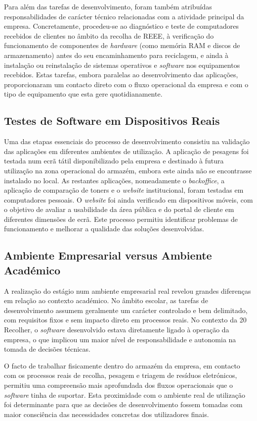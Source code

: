 Para além das tarefas de desenvolvimento, foram também atribuídas responsabilidades de carácter técnico relacionadas com a atividade principal da empresa. Concretamente, procedeu-se ao diagnóstico e teste de computadores recebidos de clientes no âmbito da recolha de \ac{REEE}, à verificação do funcionamento de componentes de \textit{hardware} (como memória \ac{RAM} e discos de armazenamento) antes do seu encaminhamento para reciclagem, e ainda à instalação ou reinstalação de sistemas operativos e \textit{software} nos equipamentos recebidos. Estas tarefas, embora paralelas ao desenvolvimento das aplicações, proporcionaram um contacto direto com o fluxo operacional da empresa e com o tipo de equipamento que esta gere quotidianamente.

\subsection{Testes de Software em Dispositivos Reais}

Uma das etapas essenciais do processo de desenvolvimento consistiu na validação das aplicações em diferentes ambientes de utilização. A aplicação de pesagens foi testada num ecrã tátil disponibilizado pela empresa e destinado à futura utilização na zona operacional do armazém, embora este ainda não se encontrasse instalado no local. As restantes aplicações, nomeadamente o \textit{backoffice}, a aplicação de comparação de toners e o \textit{website} institucional, foram testadas em computadores pessoais. O \textit{website} foi ainda verificado em dispositivos móveis, com o objetivo de avaliar a usabilidade da área pública e do portal de cliente em diferentes dimensões de ecrã. Este processo permitiu identificar problemas de funcionamento e melhorar a qualidade das soluções desenvolvidas.

\subsection{Ambiente Empresarial versus Ambiente Académico}

A realização do estágio num ambiente empresarial real revelou grandes diferenças em relação ao contexto académico. No âmbito escolar, as tarefas de desenvolvimento assumem geralmente um carácter controlado e bem delimitado, com requisitos fixos e sem impacto direto em processos reais. No contexto da 20 Recolher, o \textit{software} desenvolvido estava diretamente ligado à operação da empresa, o que implicou um maior nível de responsabilidade e autonomia na tomada de decisões técnicas.

O facto de trabalhar fisicamente dentro do armazém da empresa, em contacto com os processos reais de recolha, pesagem e triagem de resíduos eletrónicos, permitiu uma compreensão mais aprofundada dos fluxos operacionais que o \textit{software} tinha de suportar. Esta proximidade com o ambiente real de utilização foi determinante para que as decisões de desenvolvimento fossem tomadas com maior consciência das necessidades concretas dos utilizadores finais.


